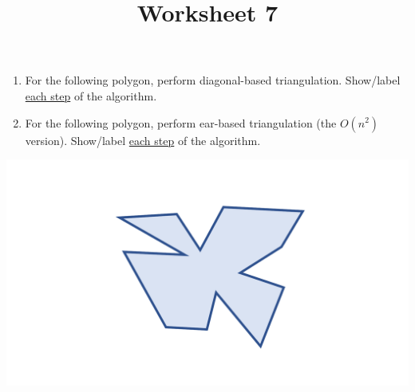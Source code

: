 \documentclass[a4paper,12pt]{article}
\title{Worksheet 7}
\begin{document}
\maketitle

\worksheetGroundRules

\worksheetSubmission

\assignmentInstructions

\begin{enumerate}
\item For the following polygon, perform diagonal-based triangulation. Show/label \uline{each step} of the algorithm. 
\item For the following polygon, perform ear-based triangulation (the $O(n^2)$ version). Show/label \uline{each step} of the algorithm. 
\end{enumerate}

\begin{center}
\includegraphics[width=0.75\linewidth]{../images/worksheet3.pdf}
\end{center}



\newpage
\end{document}
